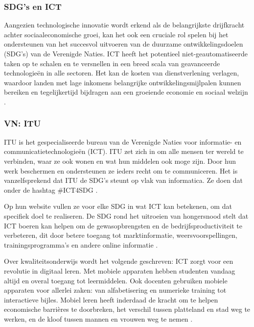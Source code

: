\subsubsection{SDG's en ICT}
Aangezien technologische innovatie wordt erkend als de belangrijkste drijfkracht achter sociaaleconomische groei, kan het ook een cruciale rol spelen bij het ondersteunen van het succesvol uitvoeren van de duurzame ontwikkelingsdoelen (SDG's) van de Verenigde Naties. ICT heeft het potentieel niet-geautomatiseerde taken op te schalen en te versnellen in een breed scala van geavanceerde technologieën in alle sectoren. Het kan de kosten van dienstverlening verlagen, waardoor landen met lage inkomens belangrijke ontwikkelingsmijlpalen kunnen bereiken en tegelijkertijd bijdragen aan een groeiende economie en sociaal welzijn \autocite{Ameyed2018}.

\subsubsection{VN: ITU}
ITU is het gespecialiseerde bureau van de Verenigde Naties voor informatie- en communicatietechnologieën (ICT). ITU zet zich in om alle mensen ter wereld te verbinden, waar ze ook wonen en wat hun middelen ook moge zijn. Door hun werk beschermen en ondersteunen ze ieders recht om te communiceren.
Het is vanzelfsprekend dat ITU de SDG's steunt op vlak van informatica. Ze doen dat onder de hashtag \#ICT4SDG \autocite{ITU2015}.

Op hun website vullen ze voor elke SDG in wat ICT kan betekenen, om dat specifiek doel te realiseren. De SDG rond het uitroeien van hongersnood stelt dat ICT boeren kan helpen om de gewasopbrengsten en de bedrijfsproductiviteit te verbeteren, dit door betere toegang tot marktinformatie, weersvoorspellingen, trainingsprogramma's en andere online informatie \autocite{ITU2015}.

Over kwaliteitsonderwijs wordt het volgende geschreven: ICT zorgt voor een revolutie in digitaal leren. Met mobiele apparaten hebben studenten vandaag altijd en overal toegang tot leermiddelen. Ook docenten gebruiken mobiele apparaten voor allerlei zaken: van alfabetisering en numerieke training tot interactieve bijles. Mobiel leren heeft inderdaad de kracht om te helpen economische barrières te doorbreken, het verschil tussen platteland en stad weg te werken, en de kloof tussen mannen en vrouwen weg te nemen \autocite{ITU2015}.


